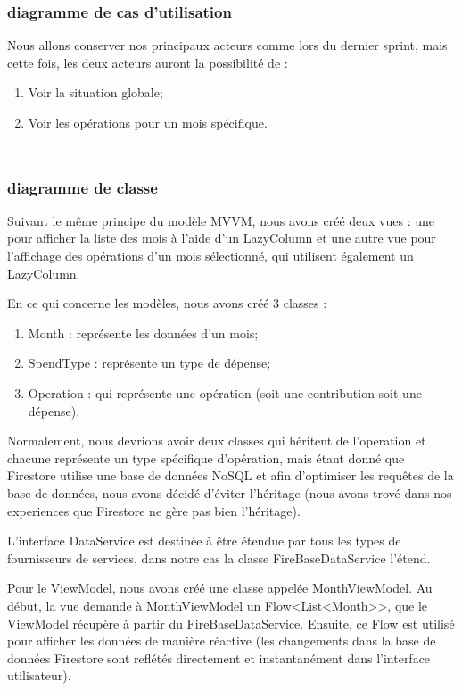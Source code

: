\subsubsection{diagramme de cas d'utilisation}
Nous allons conserver nos principaux acteurs comme lors du dernier sprint, mais cette fois, les deux acteurs auront la possibilité de :
\begin{enumerate}
  \item Voir la situation globale;
  \item Voir les opérations pour un mois spécifique.
\end{enumerate}
\vfill
$ $

$ $
\subsubsection{diagramme de classe}
Suivant le même principe du modèle MVVM, nous avons créé deux vues : une pour afficher la liste des mois à l'aide d'un LazyColumn et une autre vue pour l'affichage des opérations d'un mois sélectionné, qui utilisent également un LazyColumn.

En ce qui concerne les modèles, nous avons créé 3 classes :
\begin{enumerate}
  \item Month : représente les données d'un mois;
  \item SpendType : représente un type de dépense;
  \item Operation : qui représente une opération (soit une contribution soit une dépense).
\end{enumerate}

Normalement, nous devrions avoir deux classes qui héritent de l'operation et chacune représente un type spécifique d'opération, mais étant donné que Firestore utilise une base de données NoSQL et afin d'optimiser les requêtes de la base de données, nous avons décidé d'éviter l'héritage (nous avons trové dans nos experiences que Firestore ne gère pas bien l'héritage).

L'interface DataService est destinée à être étendue par tous les types de fournisseurs de services, dans notre cas la classe FireBaseDataService l'étend.

Pour le ViewModel, nous avons créé une classe appelée MonthViewModel. Au début, la vue demande à MonthViewModel un Flow<List<Month>>, que le ViewModel récupère à partir du FireBaseDataService. Ensuite, ce Flow est utilisé pour afficher les données de manière réactive (les changements dans la base de données Firestore sont reflétés directement et instantanément dans l'interface utilisateur).
\vfill

$ $
\newpage
$ $
\newpage
